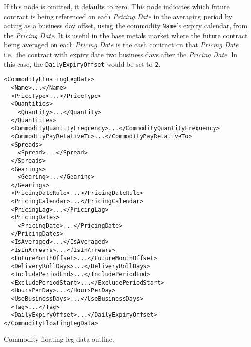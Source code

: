 \begin{itemize}
If this node is omitted, it defaults to zero. This node indicates which future contract is being referenced on each \textit{Pricing Date} in the averaging period by acting as a business day offset, using the commodity \lstinline!Name!'s expiry calendar, from the \textit{Pricing Date}. It is useful in the base metals market where the future contract being averaged on each \textit{Pricing Date} is the cash contract on that \textit{Pricing Date} i.e.\ the contract with expiry date two business days after the \textit{Pricing Date}. In this case, the \lstinline!DailyExpiryOffset! would be set to \lstinline!2!.

\end{itemize}

\begin{listing}[h!]
\begin{verbatim}
<CommodityFloatingLegData>
  <Name>...</Name>
  <PriceType>...</PriceType>
  <Quantities>
    <Quantity>...</Quantity>
  </Quantities>
  <CommodityQuantityFrequency>...</CommodityQuantityFrequency>
  <CommodityPayRelativeTo>...</CommodityPayRelativeTo>
  <Spreads>
    <Spread>...</Spread>
  </Spreads>
  <Gearings>
    <Gearing>...</Gearing>
  </Gearings>
  <PricingDateRule>...</PricingDateRule>
  <PricingCalendar>...</PricingCalendar>
  <PricingLag>...</PricingLag>
  <PricingDates>
    <PricingDate>...</PricingDate>
  </PricingDates>
  <IsAveraged>...</IsAveraged>
  <IsInArrears>...</IsInArrears>
  <FutureMonthOffset>...</FutureMonthOffset>
  <DeliveryRollDays>...</DeliveryRollDays>
  <IncludePeriodEnd>...</IncludePeriodEnd>
  <ExcludePeriodStart>...</ExcludePeriodStart>
  <HoursPerDay>...</HoursPerDay>
  <UseBusinessDays>...</UseBusinessDays>
  <Tag>...</Tag>
  <DailyExpiryOffset>...</DailyExpiryOffset>
</CommodityFloatingLegData>
\end{verbatim}
\caption{Commodity floating leg data outline.}
\label{lst:commodity_floating_leg_data}
\end{listing}

